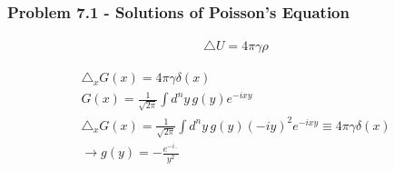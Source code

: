 \documentclass[10pt,a4paper]{article}
\theoremstyle{definition}
\begin{document}
\subsubsection{Problem 7.1 - Solutions of Poisson's Equation}
\begin{align}
    \triangle U=4\pi \gamma\rho
\end{align}

\begin{align}
    \triangle_x G(x)=4\pi \gamma\delta(x)\\
    G(x)=\frac{1}{\sqrt{2\pi}}\int d^ny\,g(y)e^{-ixy}\\
    \triangle_x G(x)=\frac{1}{\sqrt{2\pi}}\int d^ny\,g(y)(-iy)^2e^{-ixy}\equiv4\pi\gamma\delta(x)\\
    \rightarrow g(y)=-\frac{e^{-i..}}{y^2}
\end{align}

\newpage
\end{document}
